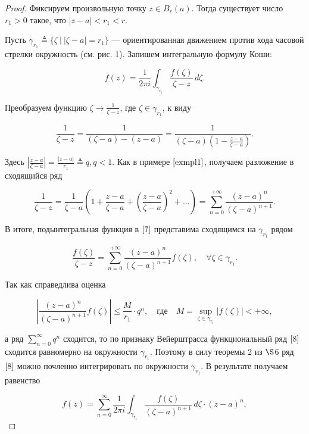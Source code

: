 \begin{proof}
Фиксируем произвольную точку $z \in B_r(a)$. Тогда существует число $r_1 > 0$ такое, что $|z - a| < r_1 < r$.

Пусть $\gamma_{r_1} \triangleq \{\zeta \: \big| \: |\zeta - a| = r_1 \}$ — ориентированная движением против хода часовой стрелки окружность (см. рис. 1). Запишем интегральную формулу Коши:

\begin{equation} \label{7}
f(z) = \frac{1}{2 \pi i} \int_{\gamma_{r_1}} \frac{f(\zeta)}{\zeta - z} \,d\zeta.
\end{equation}

Преобразуем функцию $\zeta \to \frac{1}{\zeta - z}$, где $\zeta \in \gamma_{r_1}$, к виду

$$
\frac{1}{\zeta - z} = \frac{1}{(\zeta - a) - (z - a)} = \frac{1}{(\zeta - a)\left( 1 - \frac{z - a}{\zeta - a}\right)}.
$$

Здесь $\left|\frac{z - a}{\zeta - a} \right| = \frac{|z - a|}{r_1} \triangleq q, q < 1$. Как в примере $\eqref{exmpl1}$, получаем разложение в сходящийся ряд

$$
\frac{1}{\zeta - z} = \frac{1}{\zeta - a} \left( 1 + \frac{z - a}{\zeta - a} + \left( \frac{z - a}{\zeta - a}\right)^2 + \ldots \right) = \sum\limits_{n = 0}^{+\infty} \frac{(z - a)^n}{(\zeta - a)^{n + 1}}.
$$

В итоге, подынтегральная функция в $\eqref{7}$ представима сходящимся на $\gamma_{r_1}$ рядом

\begin{equation} \label{8}
\frac{f(\zeta)}{\zeta - z} = \sum\limits_{n = 0}^{+\infty} \frac{(z - a)^n}{(\zeta - a)^{n + 1}} f(\zeta), \quad \forall \zeta \in \gamma_{r_1}.
\end{equation}

Так как справедлива оценка

$$
\left| \frac{(z - a)^n}{(\zeta - a)^{n + 1}} f(\zeta) \right| \le \frac{M}{r_1} \cdot q^n, \quad \text{где} \quad M = \sup_{\zeta \in \gamma_{r_1}} |f(\zeta)| < +\infty,
$$

а ряд $\sum\limits_{n = 0}^{\infty} q^n$ сходится, то по признаку Вейерштрасса функциональный ряд $\eqref{8}$ сходится равномерно на окружности $\gamma_{r_1}$. Поэтому в силу теоремы 2 из $\S$6 ряд $\eqref{8}$ можно почленно интегрировать по окружности $\gamma_{r_1}$. В результате получаем равенство

\begin{equation} \label{9}
f(z) = \sum\limits_{n = 0}^{\infty} \frac{1}{2\pi i} \int_{\gamma_{r_1}} \frac{f(\zeta)}{(\zeta - a)^{n + 1}} \,d\zeta \cdot (z - a)^n,
\end{equation}


\end{proof}
